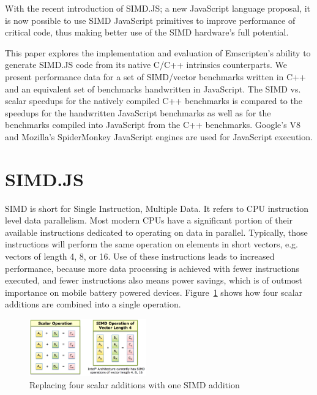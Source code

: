 \documentclass[preprint]{sigplanconf}
\begin{document}
With the recent introduction of SIMD.JS; a new JavaScript language proposal,
it is now possible to use SIMD JavaScript primitives to improve performance of
critical code, thus making better use of the SIMD hardware's full potential.

This paper explores the implementation and evaluation of Emscripten's ability to
generate SIMD.JS code from its native C/C++ intrinsics counterparts. We present performance 
data for a set of SIMD/vector benchmarks written in C++ and an equivalent set of
benchmarks handwritten in JavaScript.  The SIMD vs. scalar speedups for the natively
compiled C++ benchmarks is compared to the speedups for the handwritten JavaScript
benchmarks as well as for the benchmarks compiled into JavaScript from the C++
benchmarks. Google's V8 and Mozilla's SpiderMonkey JavaScript engines are used
for JavaScript execution.

\section{SIMD.JS}

SIMD is short for Single Instruction, Multiple Data.  It refers to CPU 
instruction level data parallelism.  Most modern CPUs have a significant 
portion of their available instructions dedicated to operating on data in
parallel.  Typically, those instructions will perform the same operation on 
elements in short vectors, e.g. vectors of length 4, 8, or 16.  Use of these 
instructions leads to increased performance, because more data processing is 
achieved with fewer instructions executed, and fewer instructions also means
power savings, which is of outmost importance on mobile battery powered
devices.  Figure~\ref{fig:simd-illustration} shows how four scalar additions are 
combined into a single operation.

\begin{figure}
\begin{center}
\includegraphics[width=0.45\textwidth]{figures/simd-04.png}
\end{center}
\caption{Replacing four scalar additions with one SIMD addition}
\label{fig:simd-illustration}
\end{figure}
\end{document}

